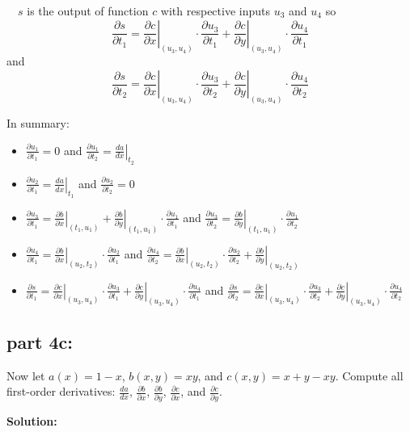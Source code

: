 \documentclass{article}
\newcommand{\at}[1]{\left. #1 \right|}
\newcommand{\diff}[2]{\frac{d #1}{d #2}}
\newcommand{\partdiff}[2]{\frac{\partial #1}{\partial #2}}
\newcommand{\dr}[1]{\textcolor{dark_red}{#1}}
\begin{document}
\dr{~~\(s\) is the output of function \(c\) with respective inputs \(u_3\) and \(u_4\) so 
\[\frac{\partial s}{\partial t_1} = \at{\frac{\partial c}{\partial x}}_{(u_3,u_4)}\cdot\frac{\partial u_3}{\partial t_1} + \at{\frac{\partial c}{\partial y}}_{(u_3,u_4)}\cdot\frac{\partial u_4}{\partial t_1}\] and 
\[\frac{\partial s}{\partial t_2} = \at{\frac{\partial c}{\partial x}}_{(u_3,u_4)}\cdot\frac{\partial u_3}{\partial t_2} + \at{\frac{\partial c}{\partial y}}_{(u_3,u_4)}\cdot\frac{\partial u_4}{\partial t_2}\]}

\dr{In summary: \begin{itemize}
\item 
\(\partdiff{u_1}{t_1} = 0\) and 
\(\partdiff{u_1}{t_2} = \at{\diff{a}{x}}_{t_2}\)
\item 
\(\partdiff{u_2}{t_1} = \at{\diff{a}{x}}_{t_1}\) and 
\(\partdiff{u_2}{t_2} = 0\)
\item 
\(\partdiff{u_3}{t_1} = \at{\partdiff{b}{x}}_{(t_1,u_1)} + \at{\partdiff{b}{y}}_{(t_1,u_1)}\cdot\partdiff{u_1}{t_1}\) and 
\(\partdiff{u_3}{t_2} = \at{\partdiff{b}{y}}_{(t_1,u_1)}\cdot\partdiff{u_1}{t_2}\)
\item 
\(\partdiff{u_4}{t_1} = \at{\partdiff{b}{x}}_{(u_2,t_2)}\cdot\partdiff{u_2}{t_1}\) and 
\(\partdiff{u_4}{t_2} = \at{\partdiff{b}{x}}_{(u_2,t_2)}\cdot\partdiff{u_2}{t_2} + \at{\partdiff{b}{y}}_{(u_2,t_2)}\)
\item
\(\partdiff{s}{t_1} = \at{\partdiff{c}{x}}_{(u_3,u_4)}\cdot\partdiff{u_3}{t_1} + \at{\partdiff{c}{y}}_{(u_3,u_4)}\cdot\partdiff{u_4}{t_1}\) and 
\(\partdiff{s}{t_2} = \at{\partdiff{c}{x}}_{(u_3,u_4)}\cdot\partdiff{u_3}{t_2} + \at{\partdiff{c}{y}}_{(u_3,u_4)}\cdot\partdiff{u_4}{t_2}\)
\end{itemize}}

\subsection*{part 4c:}

Now let \(a(x) = 1 - x\), \(b(x,y) = xy\), and \(c(x,y) = x + y - xy\). Compute all first-order derivatives: \(\frac{da}{dx}\), \(\frac{\partial b}{\partial x}\), \(\frac{\partial b}{\partial y}\), \(\frac{\partial c}{\partial x}\), and \(\frac{\partial c}{\partial y}\).

\vspace{0.5cm}

\dr{\bf Solution:}

\vspace{0.5cm}
\end{document}
